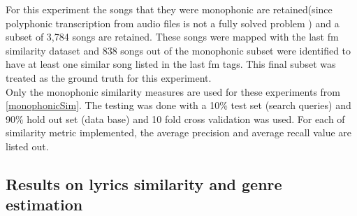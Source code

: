 \noindent For this experiment the songs that they were monophonic are retained(since polyphonic transcription from audio files is not a fully solved problem \cite{melextract}) and a subset of 3,784 songs are retained. These songs were mapped with the last fm similarity dataset and 838 songs out of the monophonic subset were identified to have at least one similar song listed in the last fm tags. This final subset was treated as the ground truth for this experiment. \\

\noindent Only the monophonic similarity measures are used for these experiments from \ref{monophonicSim}. The testing was done with a 10\% test set (search queries) and 90\% hold out set (data base) and 10 fold cross validation was used. For each of similarity metric implemented, the average precision and average recall value are listed out. 

\subsection{Results on lyrics similarity and genre estimation} \label{genrelabels}

